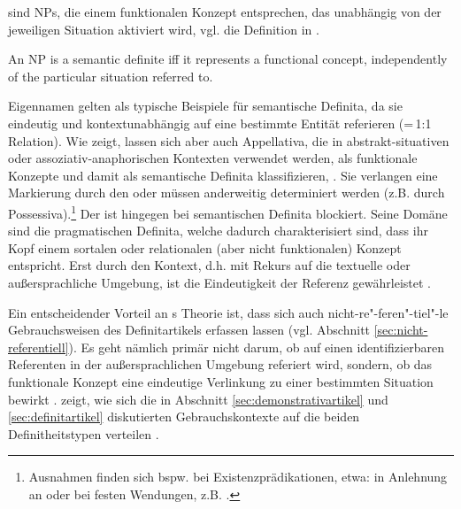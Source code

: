 \noindent
{} sind  NPs, die einem funktionalen Konzept entsprechen, das unabhängig von der jeweiligen Situation aktiviert wird, vgl. die Definition in . 

\begin{exe}
	\ex \label{semdef}  An NP is a semantic definite iff it represents a functional concept, independently of the particular situation referred to. \parencite[299]{Lobner1985}
\end{exe}

Eigennamen  gelten als typische Beispiele für semantische  Definita, da sie eindeutig und kontextunabhängig auf eine bestimmte Entität referieren (=\,1:1 Relation). Wie \textcite[299--307]{Lobner1985} zeigt, lassen sich aber auch  Appellativa, die in abstrakt-situativen  oder assoziativ-anaphorischen  Kontexten verwendet werden, als funktionale Konzepte und damit als semantische Definita  klassifizieren, \parencite[s. hierzu auch ausführlich][104--110]{Demske2001}. Sie verlangen eine Markierung durch den  oder müssen anderweitig determiniert werden (z.B. durch Possessiva).\footnote{Ausnahmen finden sich bspw. bei Existenzprädikationen, etwa:   in Anlehnung an \textcite[297]{Lobner1985} oder bei festen Wendungen, z.B.  \parencite[311]{Lobner1985}.}
Der  ist hingegen bei semantischen Definita  blockiert. Seine Domäne sind die pragmatischen  Definita, welche dadurch charakterisiert sind, dass ihr Kopf einem sortalen oder relationalen (aber nicht funktionalen) Konzept entspricht. Erst durch den Kontext, d.h. mit Rekurs auf die textuelle oder außersprachliche Umgebung, ist die Eindeutigkeit der Referenz gewährleistet \parencite[307]{Lobner1985}. 

Ein entscheidender Vorteil an \citeauthor{Lobner1985}s Theorie ist, dass sich auch nicht-re"-feren"-tiel"-le Gebrauchsweisen des Definitartikels erfassen lassen (vgl. Abschnitt \ref{sec:nicht-referentiell}). Es geht nämlich primär nicht darum, ob auf einen  identifizierbaren Referenten in der außersprachlichen Umgebung referiert wird, sondern, ob das funktionale Konzept eine eindeutige Verlinkung zu einer bestimmten Situation bewirkt \parencite[304--307]{Lobner1985}. 
 zeigt, wie sich die in Abschnitt \ref{sec:demonstrativartikel} und \ref{sec:definitartikel} diskutierten Gebrauchskontexte auf die beiden Definitheitstypen verteilen \parencite[angelehnt an und erweitert nach][73]{Szczepaniak2011a}. 

